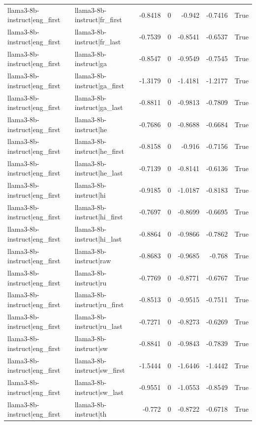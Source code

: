 \begin{table}
\begin{tabular}{l l r r r r l}
llama3-8b-instruct|eng_first & llama3-8b-instruct|fr_first & -0.8418 & 0 & -0.942 & -0.7416 & True \\
llama3-8b-instruct|eng_first & llama3-8b-instruct|fr_last & -0.7539 & 0 & -0.8541 & -0.6537 & True \\
llama3-8b-instruct|eng_first & llama3-8b-instruct|ga & -0.8547 & 0 & -0.9549 & -0.7545 & True \\
llama3-8b-instruct|eng_first & llama3-8b-instruct|ga_first & -1.3179 & 0 & -1.4181 & -1.2177 & True \\
llama3-8b-instruct|eng_first & llama3-8b-instruct|ga_last & -0.8811 & 0 & -0.9813 & -0.7809 & True \\
llama3-8b-instruct|eng_first & llama3-8b-instruct|he & -0.7686 & 0 & -0.8688 & -0.6684 & True \\
llama3-8b-instruct|eng_first & llama3-8b-instruct|he_first & -0.8158 & 0 & -0.916 & -0.7156 & True \\
llama3-8b-instruct|eng_first & llama3-8b-instruct|he_last & -0.7139 & 0 & -0.8141 & -0.6136 & True \\
llama3-8b-instruct|eng_first & llama3-8b-instruct|hi & -0.9185 & 0 & -1.0187 & -0.8183 & True \\
llama3-8b-instruct|eng_first & llama3-8b-instruct|hi_first & -0.7697 & 0 & -0.8699 & -0.6695 & True \\
llama3-8b-instruct|eng_first & llama3-8b-instruct|hi_last & -0.8864 & 0 & -0.9866 & -0.7862 & True \\
llama3-8b-instruct|eng_first & llama3-8b-instruct|raw & -0.8683 & 0 & -0.9685 & -0.768 & True \\
llama3-8b-instruct|eng_first & llama3-8b-instruct|ru & -0.7769 & 0 & -0.8771 & -0.6767 & True \\
llama3-8b-instruct|eng_first & llama3-8b-instruct|ru_first & -0.8513 & 0 & -0.9515 & -0.7511 & True \\
llama3-8b-instruct|eng_first & llama3-8b-instruct|ru_last & -0.7271 & 0 & -0.8273 & -0.6269 & True \\
llama3-8b-instruct|eng_first & llama3-8b-instruct|sw & -0.8841 & 0 & -0.9843 & -0.7839 & True \\
llama3-8b-instruct|eng_first & llama3-8b-instruct|sw_first & -1.5444 & 0 & -1.6446 & -1.4442 & True \\
llama3-8b-instruct|eng_first & llama3-8b-instruct|sw_last & -0.9551 & 0 & -1.0553 & -0.8549 & True \\
llama3-8b-instruct|eng_first & llama3-8b-instruct|th & -0.772 & 0 & -0.8722 & -0.6718 & True \\

\end{tabular}
\end{table}
